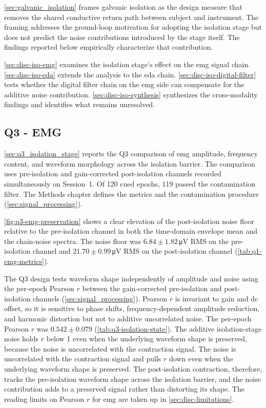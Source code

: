 \autoref{sec:galvanic_isolation} frames galvanic isolation as the design measure that removes the shared conductive return path between subject and instrument. The framing addresses the ground-loop motivation for adopting the isolation stage but does not predict the noise contributions introduced by the stage itself. The findings reported below empirically characterize that contribution.

\autoref{sec:disc-iso-emg} examines the isolation stage's effect on the \gls{emg} signal chain. \autoref{sec:disc-iso-eda} extends the analysis to the \gls{eda} chain. \autoref{sec:disc-iso-digital-filter} tests whether the digital filter chain on the \gls{emg} side can compensate for the additive noise contribution. \autoref{sec:disc-iso-synthesis} synthesizes the cross-modality findings and identifies what remains unresolved.

\subsection{Q3 - EMG}
\label{sec:disc-iso-emg}

\autoref{sec:q3_isolation_stage} reports the Q3 comparison of \gls{emg} amplitude, frequency content, and waveform morphology across the isolation barrier. The comparison uses pre-isolation and gain-corrected post-isolation channels recorded simultaneously on Session~1. Of 120 cued epochs, 119 passed the contamination filter. The Methods chapter defines the metrics and the contamination procedure (\autoref{sec:signal_processing}).

\autoref{fig:q3-emg-preservation} shows a clear elevation of the post-isolation noise floor relative to the pre-isolation channel in both the time-domain envelope mean and the chain-noise spectra. The noise floor was $\num{6.84} \pm \num{1.82}$\,\si{\micro\volt} RMS on the pre-isolation channel and $\num{21.70} \pm \num{0.99}$\,\si{\micro\volt} RMS on the post-isolation channel (\autoref{tab:q1-emg-metrics}).

The Q3 design tests waveform shape independently of amplitude and noise using the per-epoch Pearson \(r\) between the gain-corrected pre-isolation and post-isolation channels (\autoref{sec:signal_processing}). Pearson \(r\) is invariant to gain and \gls{dc} offset, so it is sensitive to phase shifts, frequency-dependent amplitude reduction, and harmonic distortion but not to additive uncorrelated noise. The per-epoch Pearson \(r\) was $\num{0.542} \pm \num{0.079}$
(\autoref{tab:q3-isolation-state}). The additive isolation-stage noise holds \(r\) below 1 even when the underlying waveform shape is preserved, because the noise is uncorrelated with the contraction signal. The noise is uncorrelated with the contraction signal and pulls \(r\) down even when the underlying waveform shape is preserved. The post-isolation contraction, therefore, tracks the pre-isolation waveform shape across the isolation barrier, and the noise contribution adds to a preserved signal rather than distorting its shape. The reading limits on Pearson \(r\) for \gls{emg} are taken up in \autoref{sec:disc-limitations}.

